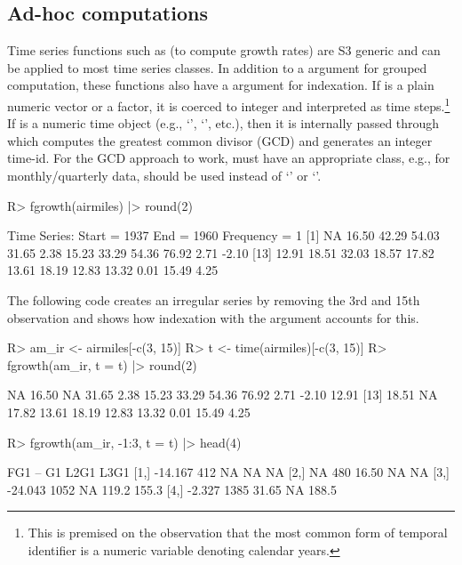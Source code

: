 \documentclass[article]{jss}
\newcommand{\class}[1]{`\code{#1}'}
\newcommand{\fct}[1]{\code{#1()}}
\begin{document}
\subsection{Ad-hoc computations}
%
Time series functions such as \fct{fgrowth} (to compute growth rates) are S3 generic and can be applied to most time series classes. In addition to a  argument for grouped computation, these functions also have a  argument for indexation. If  is a plain numeric vector or a factor, it is coerced to integer and interpreted as time steps.\footnote{This is premised on the observation that the most common form of temporal identifier is a numeric variable denoting calendar years.} If  is a numeric time object (e.g., \class{Date}, \class{POSIXct}, etc.), then it is internally passed through  which computes the greatest common divisor (GCD) and generates an integer time-id. For the GCD approach to work,  must have an appropriate class, e.g., for monthly/quarterly data,  should be used instead of \class{Date} or \class{POSIXct}. %
%
\begin{Schunk}
\begin{Sinput}
R> fgrowth(airmiles) |> round(2)
\end{Sinput}
\begin{Soutput}
Time Series:
Start = 1937 
End = 1960 
Frequency = 1 
 [1]    NA 16.50 42.29 54.03 31.65  2.38 15.23 33.29 54.36 76.92  2.71 -2.10
[13] 12.91 18.51 32.03 18.57 17.82 13.61 18.19 12.83 13.32  0.01 15.49  4.25
\end{Soutput}
\end{Schunk}
The following code creates an irregular series by removing the 3rd and 15th observation and shows how indexation with the  argument accounts for this.
%
\begin{Schunk}
\begin{Sinput}
R> am_ir <- airmiles[-c(3, 15)]
R> t <- time(airmiles)[-c(3, 15)]
R> fgrowth(am_ir, t = t) |> round(2)
\end{Sinput}
\begin{Soutput}
 [1]    NA 16.50    NA 31.65  2.38 15.23 33.29 54.36 76.92  2.71 -2.10 12.91
[13] 18.51    NA 17.82 13.61 18.19 12.83 13.32  0.01 15.49  4.25
\end{Soutput}
\begin{Sinput}
R> fgrowth(am_ir, -1:3, t = t) |> head(4)
\end{Sinput}
\begin{Soutput}
         FG1   --    G1  L2G1  L3G1
[1,] -14.167  412    NA    NA    NA
[2,]      NA  480 16.50    NA    NA
[3,] -24.043 1052    NA 119.2 155.3
[4,]  -2.327 1385 31.65    NA 188.5
\end{Soutput}
\end{Schunk}
\end{document}
